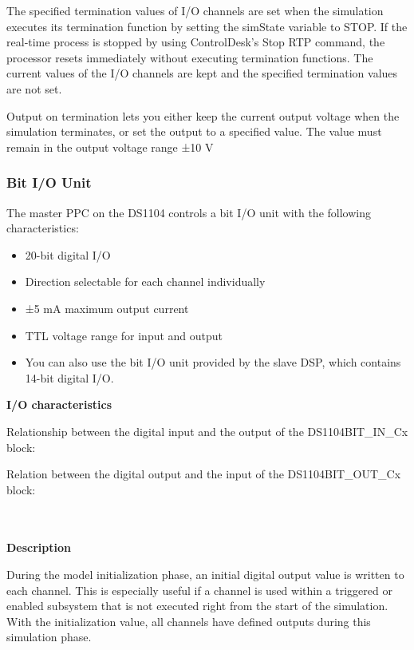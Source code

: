 The specified termination values of I/O channels are set when the simulation executes its termination function by setting the simState variable to STOP. If the real‑time process is stopped by using ControlDesk's Stop RTP command, the processor resets immediately without executing termination functions. The current values of the I/O channels are kept and the specified termination values are not set.

Output on termination lets you either keep the current output voltage when the simulation terminates, or set the output to a specified value. The value must remain in the output voltage range ±10 V

\subsubsection{Bit I/O Unit}
The master PPC on the DS1104 controls a bit I/O unit with the following characteristics:
\begin{itemize}
    \item 20-bit digital I/O
    \item Direction selectable for each channel individually
    \item ±5 mA maximum output current
    \item TTL voltage range for input and output
    \item You can also use the bit I/O unit provided by the slave DSP, which contains 14-bit digital I/O.
\end{itemize}

\noindent \textbf{I/O characteristics}\par 
Relationship between the digital input and the output of the DS1104BIT\_IN\_Cx block:


Relation between the digital output and the input of the DS1104BIT\_OUT\_Cx block:

\ \\
\ \\

\noindent \textbf{Description}\par

During the model initialization phase, an initial digital output value is written to each channel. This is especially useful if a channel is used within a triggered or enabled subsystem that is not executed right from the start of the simulation. With the initialization value, all channels have defined outputs during this simulation phase.


